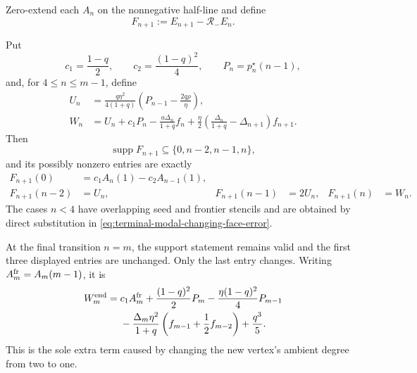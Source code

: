 Zero-extend each $A_n$ on the nonnegative half-line and define
\begin{equation}
 F_{n+1}:=E_{n+1}-\mathcal R_-E_n.
 \label{eq:terminal-modal-boundary-source}
\end{equation}

\begin{lemma}
\label{lem:terminal-modal-boundary-source}
Put
\begin{equation}
 c_1=\frac{1-q}{2},\qquad c_2=\frac{(1-q)^2}{4},\qquad
 P_n=p_n^\star(n-1),
 \label{eq:terminal-modal-source-constants}
\end{equation}
and, for $4\le n\le m-1$, define
\begin{align}
 U_n&=\frac{q\eta^2}{4(1+q)}
 \left(P_{n-1}-\frac{2q\rho}{\eta}\right),
 \label{eq:terminal-modal-source-U}\\
 W_n&=U_n+c_1P_n-
 \frac{a\Delta_n}{1+q}f_n
 +\frac\eta2\left(\frac{\Delta_n}{1+q}-\Delta_{n+1}\right)f_{n+1}.
 \label{eq:terminal-modal-source-W}
\end{align}
Then
\begin{equation}
 \operatorname{supp}F_{n+1}\subseteq\{0,n-2,n-1,n\},
 \label{eq:terminal-modal-source-support}
\end{equation}
and its possibly nonzero entries are exactly
\begin{align}
 F_{n+1}(0)&=c_1A_n(1)-c_2A_{n-1}(1),
 \label{eq:terminal-modal-source-seed}\\
 F_{n+1}(n-2)&=U_n,
 &F_{n+1}(n-1)&=2U_n,
 &F_{n+1}(n)&=W_n.
 \label{eq:terminal-modal-source-frontier}
\end{align}
The cases $n<4$ have overlapping seed and frontier stencils and are obtained
by direct substitution in
\eqref{eq:terminal-modal-changing-face-error}.

At the final transition $n=m$, the support statement remains valid and the
first three displayed entries are unchanged.  Only the last entry changes.
Writing $A_m^{\rm fr}=A_m(m-1)$, it is
\begin{equation}
 \begin{split}
 W_m^{\rm end}={}&c_1A_m^{\rm fr}
 +\frac{(1-q)^2}{2}P_m
 -\frac{\eta(1-q)^2}{4}P_{m-1}\\
 &-\frac{\Delta_m\eta^2}{1+q}
 \left(f_{m-1}+\frac12f_{m-2}\right)+\frac{q^3}{5}.
 \end{split}
 \label{eq:terminal-modal-source-final-endpoint}
\end{equation}
This is the sole extra term caused by changing the new vertex's ambient
degree from two to one.
\end{lemma}

